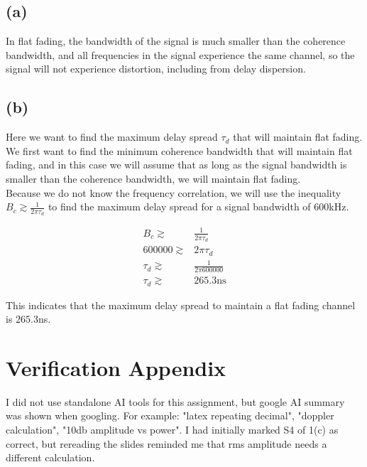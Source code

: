 \documentclass[]{article}
\begin{document}
\subsection*{(a)}
In flat fading, the bandwidth of the signal is much smaller than the coherence bandwidth, and all frequencies in the signal experience the same channel, so the signal will not experience distortion, including from delay dispersion.

\subsection*{(b)}
Here we want to find the maximum delay spread $\tau_d$ that will maintain flat fading.\\
We first want to find the minimum coherence bandwidth that will maintain flat fading, and in this case we will assume that as long as the signal bandwidth is smaller than the coherence bandwidth, we will maintain flat fading.\\
Because we do not know the frequency correlation, we will use the inequality $B_c \gtrsim \frac{1}{2\pi \tau_d}$ to find the maximum delay spread for a signal bandwidth of 600kHz.

\begin{align*}
	B_c \gtrsim& \frac{1}{2\pi \tau_d}\\
	600000 \gtrsim& 2\pi \tau_d\\
	\tau_d \gtrsim& \frac{1}{2\pi600000}\\
	\tau_d \gtrsim& 265.3 \text{ns}
\end{align*}

This indicates that the maximum delay spread to maintain a flat fading channel is $265.3$ns.

\section*{Verification Appendix}
I did not use standalone AI tools for this assignment, but google AI summary was shown when googling. For example: "latex repeating decimal", "doppler calculation", "10db amplitude vs power". I had initially marked S4 of 1(c) as correct, but rereading the slides reminded me that rms amplitude needs a different calculation.
\end{document}
